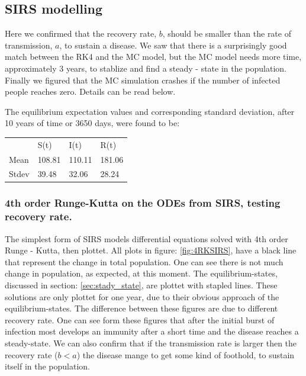 \subsection{SIRS modelling}
	Here we confirmed that the recovery rate, $b$, should be smaller than the rate of transmission, $a$, to sustain a disease. We saw that there is a surprisingly good match between the RK4 and the MC model, but the MC model needs more time, approximately 3 years,  to stablize and find a steady - state in the population. Finally we figured that the MC simulation crashes if the number of infected people reaches zero. Details can be read below.
	
	The equilibrium expectation values and corresponding standard deviation, after 10 years of time or 3650 days, were found to be: \autocite{Nobody06}

\begin{table}[h]
\center
\begin{tabular}{llll}
      & S(t)   & I(t)   & R(t)   \\
Mean  & 108.81 & 110.11 & 181.06 \\
Stdev & 39.48  & 32.06  & 28.24  \\
\end{tabular}
\end{table}

	 
\subsubsection{4th order Runge-Kutta on the ODEs from SIRS, testing recovery rate.}
The simplest form of SIRS models differential equations solved with 4th order Runge - Kutta, then plottet. All plots in figure: \ref{fig:4RKSIRS}, have a black line that represent the change in total population. One can see there is not much change in population, as expected, at this moment. The equilibrium-states, discussed in section: \ref{sec:stady_state}, are plottet with stapled lines. These solutions are only plottet for one year, due to their obvious approach of the equilibrium-states. The difference between these figures are due to different recovery rate. One can see form these figures that after the initial burst of infection most develops an immunity after a short time and the disease reaches a steady-state. We can also confirm that if the transmission rate is larger then the recovery rate ($b<a$) the disease mange to get some kind of foothold, to sustain itself in the population.

